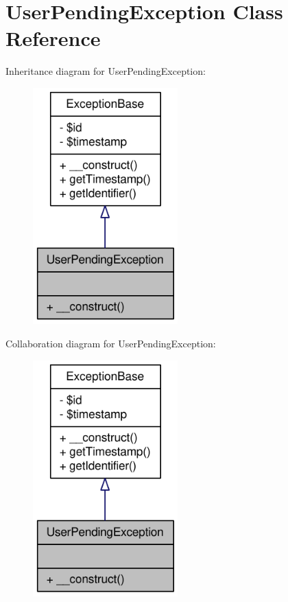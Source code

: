 \hypertarget{classUserPendingException}{
\section{UserPendingException Class Reference}
\label{classUserPendingException}
}


Inheritance diagram for UserPendingException:\nopagebreak
\begin{figure}[H]
\begin{center}
\leavevmode
\includegraphics[width=158pt]{classUserPendingException__inherit__graph}
\end{center}
\end{figure}


Collaboration diagram for UserPendingException:\nopagebreak
\begin{figure}[H]
\begin{center}
\leavevmode
\includegraphics[width=158pt]{classUserPendingException__coll__graph}
\end{center}
\end{figure}
